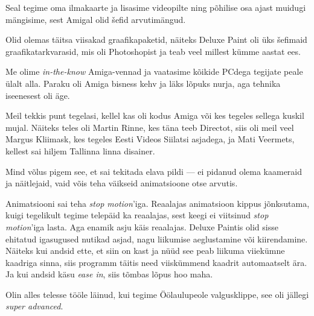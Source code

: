 Seal tegime oma ilmakaarte ja lisasime videopilte ning põhilise osa ajast 
muidugi mängisime, sest Amigal olid šefid arvutimängud. 


Olid olemas täitsa viisakad graafikapaketid, näiteks Deluxe Paint oli üks šefimaid graafikatarkvarasid, mis oli 
Photoshopist ja teab veel millest kümme aastat ees. 

Me olime \emph{in-the-know} Amiga-vennad ja vaatasime kõikide 
PCdega tegijate peale ülalt alla. Paraku oli Amiga bisness kehv ja 
läks lõpuks nurja, aga tehnika iseenesest oli äge. 

Meil tekkis punt tegelasi, kellel kas oli kodus Amiga või kes 
tegeles sellega kuskil mujal. Näiteks teles oli Martin Rinne, kes 
täna teeb Directot,
siis oli meil veel Margus Kliimask, kes tegeles 
Eesti 
Videos Siilatsi asjadega, ja Mati 
Veermets, kellest sai hiljem Tallinna linna disainer.

Mind võlus pigem see, et sai tekitada 
elava pildi --- ei pidanud olema kaameraid ja näitlejaid, vaid 
võis teha väikseid animatsioone otse arvutis.


Animatsiooni sai teha \emph{stop 
motion}'iga. Reaalajas animatsioon kippus jõnksutama, kuigi 
tegelikult tegime telepäid ka reaalajas, sest keegi ei viitsinud 
\emph{stop motion}'iga lasta. Aga enamik asju käis 
reaalajas. Deluxe Paintis olid sisse ehitatud igasugused 
nutikad asjad, nagu liikumise aeglustamine või kiirendamine. Näiteks kui andsid 
ette, et siin on kast ja nüüd see peab liikuma 
viiekümne kaadriga sinna, siis programm täitis need 
viiskümmend kaadrit automaatselt ära. Ja kui andsid käsu \emph{ease in}, siis 
tõmbas lõpus hoo maha. 

Olin alles telesse tööle läinud, kui tegime 
Öölaulupeole 
valgusklippe, see oli jällegi \emph{super advanced}.

